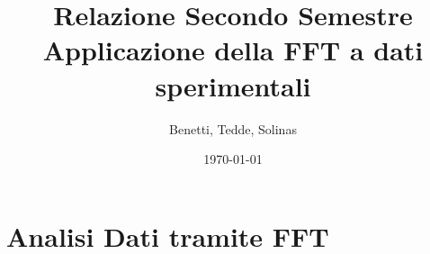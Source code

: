\documentclass[12pt,a4paper]{report}
\title{Relazione Secondo Semestre\\Applicazione della FFT a dati sperimentali}
\author{Benetti, Tedde, Solinas}
\date{\today}
\begin{document}
\maketitle

\tableofcontents

\chapter{Analisi Dati tramite FFT}

\end{document}
